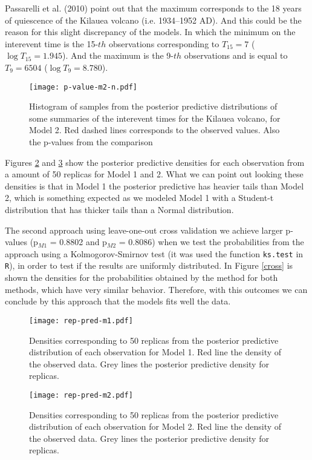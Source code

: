 \documentclass{asaproc}
\begin{document}
Passarelli et al. (2010) point out that the maximum corresponds to the 18 years of quiescence of the Kilauea volcano (i.e. 1934–1952 AD). And this could be the reason for this slight discrepancy of the models. In which the minimum on the interevent time is the 15-$th$ observations corresponding to $T_{15} = 7$ ($\log T_{15} = 1.945$). And the maximum is the 9-$th$ observations and is equal to $T_{9} = 6504$ ($\log T_{9} = 8.780$). 
\begin{figure}[H]
\centering
\texttt{[image: p-value-m2-n.pdf]}
\caption{Histogram of samples from the posterior predictive distributions of some summaries of the interevent times for the Kilauea volcano, for Model 2. Red dashed lines corresponds to the observed values. Also the p-values from the comparison}
\label{FigMC2}
\end{figure}

Figures \ref{FigREPPRE1} and \ref{FigREPPRE2} show the posterior predictive densities for each observation from a amount of 50 replicas for Model 1 and 2. What we can point out looking these densities is that in Model 1 the posterior predictive has heavier tails than Model 2, which is something expected as we modeled Model 1 with a Student-t distribution that has thicker tails than a Normal distribution. 

The second approach using leave-one-out cross validation we achieve larger p-values (p$_{M1}$ = 0.8802 and p$_{M2}$ = 0.8086) when we test the probabilities from the approach using a Kolmogorov-Smirnov test (it was used the function \texttt{ks.test} in \texttt{R}), in order to test if the results are uniformly distributed. In Figure \ref{cross} is shown the densities for the probabilities obtained by the method for both methods, which have very similar behavior. Therefore, with this outcomes we can conclude by this approach that the models fits well the data.
\begin{figure}[H]
\centering
\texttt{[image: rep-pred-m1.pdf]}
\caption{Densities corresponding to 50 replicas from the posterior predictive distribution of each observation for Model 1. Red line the density of the observed data. Grey lines the posterior predictive density for replicas.}
\label{FigREPPRE1}
\end{figure}

\begin{figure}[H]
\centering
\texttt{[image: rep-pred-m2.pdf]}
\caption{Densities corresponding to 50 replicas from the posterior predictive distribution of each observation for Model 2. Red line the density of the observed data. Grey lines the posterior predictive density for replicas.}
\label{FigREPPRE2}
\end{figure}
\end{document}
